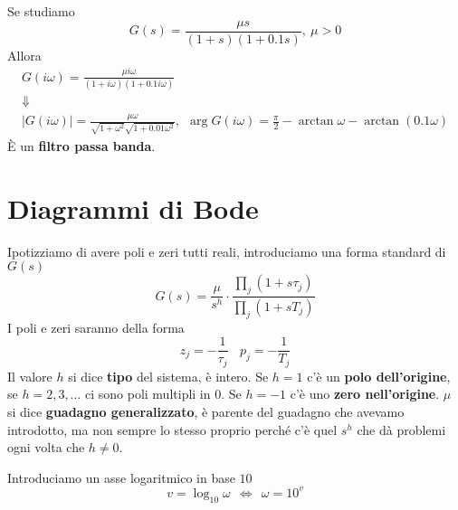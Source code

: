Se studiamo
\begin{equation*}
	G(s) =\frac{\mu s}{(1+s)(1+0.1s)} ,\ \mu  >0
\end{equation*}
Allora
\begin{gather*}
	G(i\omega) =\frac{\mu i\omega }{(1+i\omega)(1+0.1i\omega)}\\
	\Downarrow \\
	| G(i\omega)| =\frac{\mu \omega }{\sqrt{1+\omega ^2}\sqrt{1+0.01\omega ^2}} ,\ \ \arg G(i\omega) =\frac{\pi }{2} -\arctan \omega -\arctan(0.1\omega)
\end{gather*}
È un \textbf{filtro passa banda}.

\section{Diagrammi di Bode}

Ipotizziamo di avere poli e zeri tutti reali, introduciamo una forma standard di $G(s)$
\begin{equation*}
	\boxed{G(s) =\frac{\mu }{s^h} \cdot \frac{\prod _j(1+s\tau _j)}{\prod _j(1+sT_j)}}
\end{equation*}
I poli e zeri saranno della forma
\begin{equation*}
	z_j =-\frac{1}{\tau _j} \ \ \ \ p_j =-\frac{1}{T_j}
\end{equation*}
Il valore $h$ si dice \textbf{tipo} del sistema, è intero. Se $h=1$ c'è un \textbf{polo dell'origine}, se $h=2,3,\dotsc $ ci sono poli multipli in $0$. Se $h=-1$ c'è uno \textbf{zero nell'origine}. $\mu $ si dice \textbf{guadagno generalizzato}, è parente del guadagno che avevamo introdotto, ma non sempre lo stesso proprio perché c'è quel $s^h$ che dà problemi ogni volta che $h\neq 0$.

Introduciamo un asse logaritmico in base $10$
\begin{equation*}
	v=\log_{10} \omega \ \ \iff \ \ \omega =10^v
\end{equation*}

